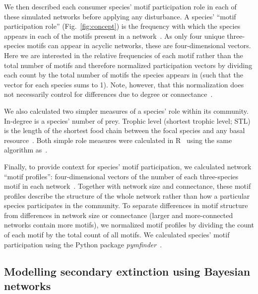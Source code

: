 \documentclass[12pt]{article}
\begin{document}
\begin{spacing}{2.0}
        
        We then described each consumer species' motif participation role in each of these simulated networks before applying any disturbance. 
        A species' ``motif participation role'' (Fig.~\ref{fig:concept}) is the frequency with which the species appears in each of the motifs present in a network~\citep{Stouffer2012}.
        As only four unique three-species motifs can appear in acyclic networks, these are four-dimensional vectors. 
        Here we are interested in the relative frequencies of each motif rather than the total number of motifs and therefore normalized participation vectors by dividing each count by the total number of motifs the species appears in (such that the vector for each species sums to 1).
        Note, however, that this normalization does not necessarily control for differences due to degree or connectance~\citep{Cirtwill2022Oikos}. 


        We also calculated two simpler measures of a species' role within its community.
        In-degree is a species' number of prey.
        Trophic level (shortest trophic level; STL) is the length of the shortest food chain between the focal species and any basal resource~\citep{Williams2004}.
        Both simple role measures were calculated in R~\citep{R} using the same algorithm as~\citet{Eklof2013}.

        
        Finally, to provide context for species' motif participation, we calculated network ``motif profiles'': four-dimensional vectors of the number of each three-species motif in each network~\citep{Stouffer2012}.
        Together with network size and connectance, these motif profiles describe the structure of the whole network rather than how a particular species participates in the community.
        To separate differences in motif structure from differences in network size or connectance (larger and more-connected networks contain more motifs), we normalized motif profiles by dividing the count of each motif by the total count of all motifs. 
        We calculated species' motif participation using the Python package \emph{pymfinder}~\citep{pymfinder}.

    
    \subsection*{Modelling secondary extinction using Bayesian networks}



\end{spacing}
\end{document}
